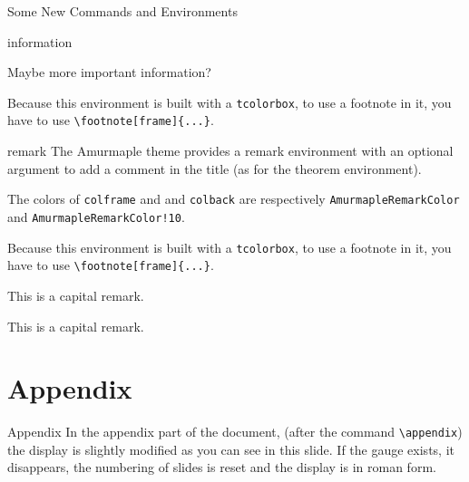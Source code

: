 \documentclass[10pt,aspectratio=169,english]{beamer}
\begin{document}
\begin{frame}{Some New Commands and Environments}
\begin{docEnvironment}{information}{}
\begin{information}
  Maybe more important information?
\end{information}
Because this environment is built with a \texttt{tcolorbox}, to use a footnote in it, you have to use \lstinline+\footnote[frame]{...}+.
\end{docEnvironment}

\begin{docEnvironment}{remark}{}
The Amurmaple theme provides a remark environment with an optional
  argument to add a comment in the title (as for the theorem environment).
  
  The colors of \lstinline+colframe+ and and \lstinline+colback+ are respectively \lstinline+AmurmapleRemarkColor+ and \lstinline+AmurmapleRemarkColor!10+. 
\label{sl:remark}

Because this environment is built with a \texttt{tcolorbox}, to use a footnote in it, you have to use \lstinline+\footnote[frame]{...}+.

  \begin{Code}
\begin{remark}
  This is a capital remark.
\end{remark}
\end{Code}
\begin{remark}
  This is a capital remark.
\end{remark}

\end{docEnvironment}

\end{frame}

\appendix

\section{Appendix}

\sepframe

\begin{frame}[fragile]{Appendix}
  In the appendix part of the document, (after the command
  \lstinline+\appendix+) the display is slightly modified as you
  can see in this slide. If the gauge exists, it disappears, the numbering
  of slides is reset and the display is in roman form.
\end{frame}


\end{document}
